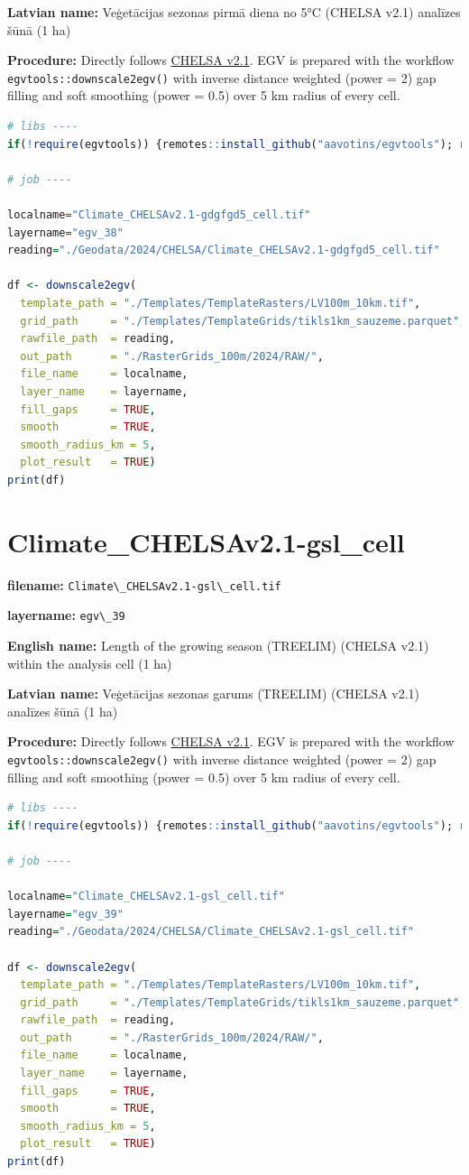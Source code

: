\documentclass[
]{book}
\newcommand{\passthrough}[1]{#1}
\begin{document}
\textbf{Latvian name:} Veģetācijas sezonas pirmā diena no 5°C (CHELSA v2.1) analīzes šūnā (1 ha)

\textbf{Procedure:} Directly follows \hyperref[Ch04.11]{CHELSA v2.1}. EGV is prepared with the
workflow \passthrough{\lstinline!egvtools::downscale2egv()!} with inverse distance weighted (power = 2)
gap filling and soft smoothing (power = 0.5) over 5 km radius of every cell.

\begin{lstlisting}[language=R]
# libs ----
if(!require(egvtools)) {remotes::install_github("aavotins/egvtools"); require(egvtools)}

# job ----

localname="Climate_CHELSAv2.1-gdgfgd5_cell.tif"
layername="egv_38"
reading="./Geodata/2024/CHELSA/Climate_CHELSAv2.1-gdgfgd5_cell.tif"

df <- downscale2egv(
  template_path = "./Templates/TemplateRasters/LV100m_10km.tif",
  grid_path     = "./Templates/TemplateGrids/tikls1km_sauzeme.parquet",
  rawfile_path  = reading,
  out_path      = "./RasterGrids_100m/2024/RAW/",
  file_name     = localname,
  layer_name    = layername,
  fill_gaps     = TRUE,
  smooth        = TRUE,
  smooth_radius_km = 5,
  plot_result   = TRUE)
print(df)
\end{lstlisting}

\section{Climate\_CHELSAv2.1-gsl\_cell}\label{ch06.039}

\textbf{filename:} \passthrough{\lstinline!Climate\_CHELSAv2.1-gsl\_cell.tif!}

\textbf{layername:} \passthrough{\lstinline!egv\_39!}

\textbf{English name:} Length of the growing season (TREELIM) (CHELSA v2.1) within the analysis cell (1 ha)

\textbf{Latvian name:} Veģetācijas sezonas garums (TREELIM) (CHELSA v2.1) analīzes šūnā (1 ha)

\textbf{Procedure:} Directly follows \hyperref[Ch04.11]{CHELSA v2.1}. EGV is prepared with the
workflow \passthrough{\lstinline!egvtools::downscale2egv()!} with inverse distance weighted (power = 2)
gap filling and soft smoothing (power = 0.5) over 5 km radius of every cell.

\begin{lstlisting}[language=R]
# libs ----
if(!require(egvtools)) {remotes::install_github("aavotins/egvtools"); require(egvtools)}

# job ----

localname="Climate_CHELSAv2.1-gsl_cell.tif"
layername="egv_39"
reading="./Geodata/2024/CHELSA/Climate_CHELSAv2.1-gsl_cell.tif"

df <- downscale2egv(
  template_path = "./Templates/TemplateRasters/LV100m_10km.tif",
  grid_path     = "./Templates/TemplateGrids/tikls1km_sauzeme.parquet",
  rawfile_path  = reading,
  out_path      = "./RasterGrids_100m/2024/RAW/",
  file_name     = localname,
  layer_name    = layername,
  fill_gaps     = TRUE,
  smooth        = TRUE,
  smooth_radius_km = 5,
  plot_result   = TRUE)
print(df)
\end{lstlisting}
\end{document}
